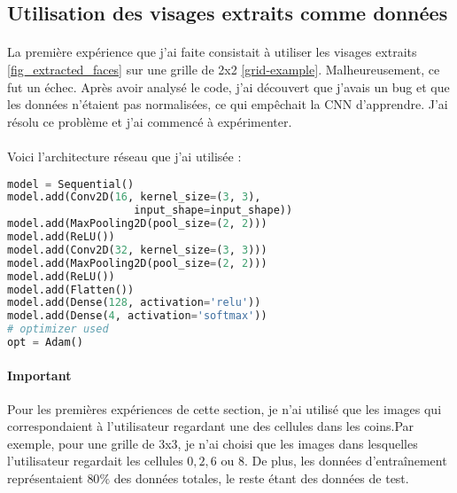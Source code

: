 \subsection{Utilisation des visages extraits comme données}
\paragraph{}
La première expérience que j'ai faite consistait à utiliser les visages extraits \ref{fig_extracted_faces} sur une grille de 2x2 \ref{grid-example}.
Malheureusement, ce fut un échec.
Après avoir analysé le code, j'ai découvert que j'avais un bug et que les données n'étaient pas normalisées, ce qui empêchait la CNN d'apprendre.
J'ai résolu ce problème et j'ai commencé à expérimenter.

\paragraph{}
Voici l'architecture réseau que j'ai utilisée :

\label{cnn_first_architecture}
\begin{lstlisting}[language=Python, caption=Première architecture de CNN]
model = Sequential()
model.add(Conv2D(16, kernel_size=(3, 3),
                    input_shape=input_shape))
model.add(MaxPooling2D(pool_size=(2, 2)))
model.add(ReLU())
model.add(Conv2D(32, kernel_size=(3, 3)))
model.add(MaxPooling2D(pool_size=(2, 2)))
model.add(ReLU())
model.add(Flatten())
model.add(Dense(128, activation='relu'))
model.add(Dense(4, activation='softmax'))
# optimizer used
opt = Adam()
\end{lstlisting}

\paragraph{Important}
Pour les premières expériences de cette section, je n'ai utilisé que les images qui correspondaient à l'utilisateur regardant une des cellules dans les coins.Par exemple, pour une grille de 3x3, je n'ai choisi que les images dans lesquelles l'utilisateur regardait les cellules $0, 2, 6$ ou $8$.
De plus, les données d'entraînement représentaient $80\%$ des données totales, le reste étant des données de test.


